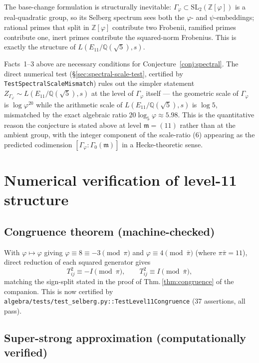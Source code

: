\documentclass[11pt,a4paper]{article}
\theoremstyle{plain}
\theoremstyle{definition}
\theoremstyle{remark}
\numberwithin{equation}{section}
\providecommand{\Zp}{\ensuremath{\mathbb{Z}[\varphi]}}
\providecommand{\Qp}{\ensuremath{\mathbb{Q}(\sqrt{5})}}
\providecommand{\Gphi}{\ensuremath{\Gamma_{\varphi}}}
\providecommand{\vp}{\varphi}
\begin{document}
The base-change formulation is structurally inevitable: $\Gphi\subset\mathrm{SL}_2(\Zp)$
is a real-quadratic group, so its Selberg spectrum sees both the $\varphi$- and
$\psi$-embeddings; rational primes that split in $\Zp$ contribute two Frobenii,
ramified primes contribute one, inert primes contribute the squared-norm Frobenius.
This is exactly the structure of $L(E_{11}/\Qp,s)$.

Facts~1--3 above are necessary conditions for Conjecture~\ref{conj:spectral}.
The direct numerical test (\S\ref{sec:spectral-scale-test}, certified by
\texttt{TestSpectralScaleMismatch}) rules out the simpler statement
$Z_{\Gphi}\sim L(E_{11}/\Qp,s)$ at the level of $\Gphi$ itself --- the
geometric scale of $\Gphi$ is $\log\varphi^{20}$ while the
arithmetic scale of $L(E_{11}/\Qp,s)$ is $\log 5$, mismatched by the
exact algebraic ratio $20\log_{5}\varphi\approx 5.98$. This is the
quantitative reason the conjecture is stated above at level
$\mathfrak{m}=(11)$ rather than at the ambient group, with the integer
component of the scale-ratio ($6$) appearing as the predicted codimension
$[\Gphi:\Gamma_{0}(\mathfrak{m})]$ in a Hecke-theoretic sense.

\section{Numerical verification of level-11 structure}
\label{sec:numerical}

\subsection*{Congruence theorem (machine-checked)}

With $\vp\mapsto\vp$ giving $\vp\equiv 8\equiv-3\pmod{\pi}$ and $\vp\equiv 4\pmod{\bar\pi}$
(where $\pi\bar\pi=11$), direct reduction of each squared generator gives
\begin{equation}
  T_{ij}^{2}\equiv -I\pmod{\pi},\qquad T_{ij}^{2}\equiv I\pmod{\bar\pi},
\end{equation}
matching the sign-split stated in the proof of Thm.\,\ref{thm:congruence} of the companion.
This is now certified by \texttt{algebra/tests/test\_selberg.py::TestLevel11Congruence}
(37 assertions, all pass).

\subsection*{Super-strong approximation (computationally verified)}
\end{document}

